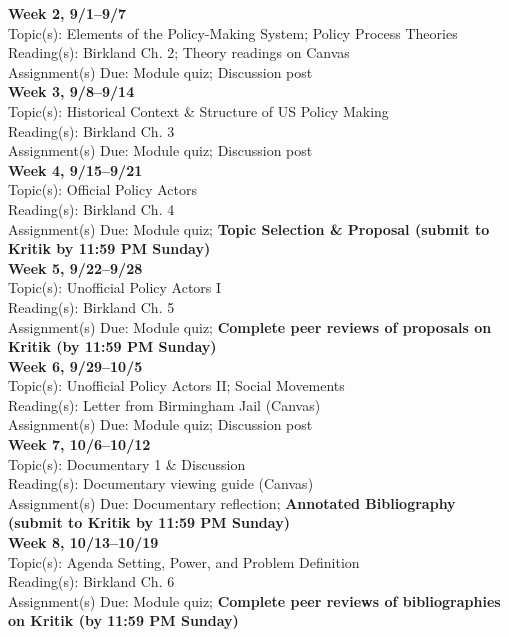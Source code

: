 \documentclass[12pt]{article}     %
\begin{document}
\noindent \textbf{Week 2, 9/1--9/7}\\
Topic(s): Elements of the Policy-Making System; Policy Process Theories\\
Reading(s): Birkland Ch. 2; Theory readings on Canvas\\
Assignment(s) Due: Module quiz; Discussion post\\

\noindent \textbf{Week 3, 9/8--9/14}\\
Topic(s): Historical Context \& Structure of US Policy Making\\
Reading(s): Birkland Ch. 3\\
Assignment(s) Due: Module quiz; Discussion post\\

\noindent \textbf{Week 4, 9/15--9/21}\\
Topic(s): Official Policy Actors\\
Reading(s): Birkland Ch. 4\\
Assignment(s) Due: Module quiz; \textbf{Topic Selection \& Proposal (submit to Kritik by 11:59 PM Sunday)}\\

\noindent \textbf{Week 5, 9/22--9/28}\\
Topic(s): Unofficial Policy Actors I\\
Reading(s): Birkland Ch. 5\\
Assignment(s) Due: Module quiz; \textbf{Complete peer reviews of proposals on Kritik (by 11:59 PM Sunday)}\\

\noindent \textbf{Week 6, 9/29--10/5}\\
Topic(s): Unofficial Policy Actors II; Social Movements\\
Reading(s): Letter from Birmingham Jail (Canvas)\\
Assignment(s) Due: Module quiz; Discussion post\\

\noindent \textbf{Week 7, 10/6--10/12}\\
Topic(s): Documentary 1 \& Discussion\\
Reading(s): Documentary viewing guide (Canvas)\\
Assignment(s) Due: Documentary reflection; \textbf{Annotated Bibliography (submit to Kritik by 11:59 PM Sunday)}\\

\noindent \textbf{Week 8, 10/13--10/19}\\
Topic(s): Agenda Setting, Power, and Problem Definition\\
Reading(s): Birkland Ch. 6\\
Assignment(s) Due: Module quiz; \textbf{Complete peer reviews of bibliographies on Kritik (by 11:59 PM Sunday)}\\
\end{document}
